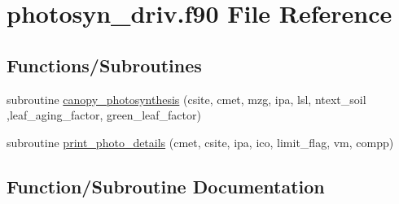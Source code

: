 \hypertarget{photosyn__driv_8f90}{}\section{photosyn\+\_\+driv.\+f90 File Reference}
\label{photosyn__driv_8f90}
\subsection*{Functions/\+Subroutines}
\begin{DoxyCompactItemize}
\item 
subroutine \hyperlink{photosyn__driv_8f90_a47b3eb47a3b63c8b9a400606fd46a86b}{canopy\+\_\+photosynthesis} (csite, cmet, mzg, ipa, lsl, ntext\+\_\+soil                                                                                                                                                                                                                           ,leaf\+\_\+aging\+\_\+factor, green\+\_\+leaf\+\_\+factor)
\item 
subroutine \hyperlink{photosyn__driv_8f90_a8775d33a4716e83ecc08bf70b4d17f15}{print\+\_\+photo\+\_\+details} (cmet, csite, ipa, ico, limit\+\_\+flag, vm, compp)
\end{DoxyCompactItemize}


\subsection{Function/\+Subroutine Documentation}
\hypertarget{photosyn__driv_8f90_a47b3eb47a3b63c8b9a400606fd46a86b}{}
